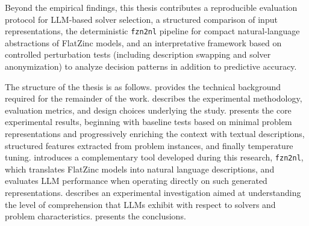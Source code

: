 \documentclass[../../main]{subfiles}
\begin{document}
Beyond the empirical findings, this thesis contributes a reproducible evaluation protocol for LLM-based solver selection, a structured comparison of input representations, the deterministic \texttt{fzn2nl} pipeline for compact natural-language abstractions of FlatZinc models, and an interpretative framework based on controlled perturbation tests (including description swapping and solver anonymization) to analyze decision patterns in addition to predictive accuracy.

The structure of the thesis is as follows.  provides the technical background required for the remainder of the work.  describes the experimental methodology, evaluation metrics, and design choices underlying the study.  presents the core experimental results, beginning with baseline tests based on minimal problem representations and progressively enriching the context with textual descriptions, structured features extracted from problem instances, and finally temperature tuning.  introduces a complementary tool developed during this research, \texttt{fzn2nl}, which translates FlatZinc models into natural language descriptions, and evaluates LLM performance when operating directly on such generated representations.  describes an experimental investigation aimed at understanding the level of comprehension that LLMs exhibit with respect to solvers and problem characteristics.  presents the conclusions.
\end{document}
